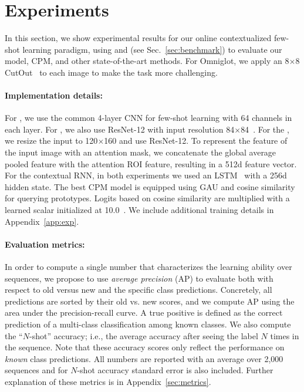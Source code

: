 \section{Experiments}
\vspace{-0.1in}
In this section, we show experimental results for our online contextualized few-shot learning
paradigm, using \ourchar{} and \ourroom{} (see Sec.~\ref{sec:benchmark}) to evaluate our model, CPM,
and other state-of-the-art methods. For Omniglot, we apply an 8$\times$8 CutOut~\citep{cutout} to
each image to make the task more challenging. 

\vspace{-0.1in} \paragraph{Implementation details:} For \ourchar{}, we use the common
4-layer CNN for few-shot learning with 64 channels in each layer. For \ourimg{}, we also use ResNet-12 
with input resolution 84$\times$84~\citep{tadam}. For the \ourroom{}, we resize the input to 
120$\times$160 and use ResNet-12. To represent
the feature of the input image with an attention mask, we concatenate the global average pooled
feature with the attention ROI feature, resulting in a 512d feature vector. For the contextual RNN,
in both experiments we used an LSTM~\citep{lstm} with a 256d hidden state. The best CPM model is
equipped using GAU and cosine similarity for querying prototypes. Logits based on cosine similarity
are multiplied with a learned scalar initialized at 10.0~\citep{tadam}. We include additional
training details in Appendix~\ref{app:exp}.

\vspace{-0.1in}
\paragraph{Evaluation metrics:}
In order to compute a single number that characterizes the learning ability over sequences, we
propose to use \textit{average precision} (AP) to evaluate
both with respect to old versus new and the
specific class predictions.
Concretely, all predictions are sorted by their old vs. new scores, and we compute AP using the area
under the precision-recall curve. A true positive is defined as the correct prediction of a
multi-class classification among known classes. We also compute the ``$N$-shot'' accuracy; i.e., the
average accuracy after seeing the label $N$ times in the sequence. Note that these accuracy scores
only reflect the performance on {\it known} class predictions. All numbers are reported with an
average over 2,000 sequences and for $N$-shot accuracy standard error is also included.
Further explanation of these metrics is in Appendix~\ref{sec:metrics}. 

